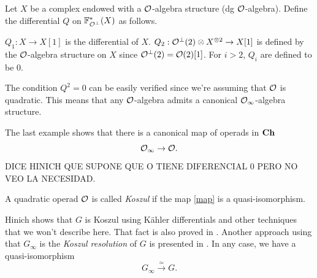 \documentclass[TFM.tex]{subfiles}
\begin{document}
\begin{ex}
Let $X$ be a complex endowed with a ${\mathcal O}$-algebra structure (dg ${\mathcal O}$-algebra). Define the differential $Q$ on $\mathbb{F}^*_{{\mathcal O}^\perp}(X)$ as follows.

$Q_1:X\to X[1]$ is the differential of $X$. $Q_2:{\mathcal O}^{\perp}(2)\otimes X^{\otimes 2}\to X[1]$ is defined by the ${\mathcal O}$-algebra structure on $X$ since ${\mathcal O}^\perp(2)={\mathcal O}(2)[1]$. For $i>2$, $Q_i$ are defined to be 0. 

The condition $Q^2=0$ can be easily verified since we're assuming that ${\mathcal O}$ is quadratic. This means that any ${\mathcal O}$-algebra admits a canonical ${\mathcal O}_\infty$-algebra structure. 
\end{ex}

The last example shows that there is a canonical map of operads in $\mathrm{\mathbf{Ch}}$
\begin{equation}\label{map}
{\mathcal O}_\infty\to {\mathcal O}.
\end{equation}
DICE HINICH QUE SUPONE QUE O TIENE DIFERENCIAL 0 PERO NO VEO LA NECESIDAD.

\begin{defi}
A quadratic operad ${\mathcal O}$ is called \emph{Koszul} if the map \ref{map} is a quasi-isomorphism.
\end{defi}

Hinich \cite{Hinich} shows that $G$ is Koszul using Kähler differentials and other techniques that we won't describe here. That fact is also proved in \cite{GJHinich}. Another approach using that $G_\infty$ is the \emph{Koszul resolution} of $G$ is presented in \cite{AlgebraicOperads}. In any case, we have a quasi-isomorphism
\begin{equation}
G_\infty\xrightarrow{\simeq} G.
\end{equation}


%




\end{document}
